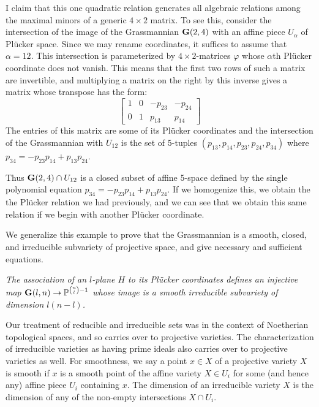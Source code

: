 \documentclass[12pt]{amsart}
\newcommand{\G}{{\bf G}}
\begin{document}
I claim that this one quadratic relation generates all algebraic relations
among the maximal minors of a generic $4\times 2$ matrix.
To see this, consider the intersection of the image of the Grassmannian
$\G(2,4)$ with an affine piece $U_\alpha$ of Pl\"ucker space.
Since we may rename coordinates, it suffices to assume that $\alpha=12$.
This intersection is parameterized by $4\times 2$-matrices $\varphi$ whose
$\alpha$th Pl\"ucker coordinate does not vanish.
This means that the first two rows of such a matrix are invertible, and
multiplying a matrix on the right by this inverse gives a matrix whose
transpose has the form:
$$
  \left[\begin{array}{cccc}
    1 & 0 & -p_{23} & -p_{24}\\
    0 & 1 &  p_{13} &  p_{14}
  \end{array}\right]
$$
The entries of this matrix are some of its Pl\"ucker
coordinates and the intersection of the Grassmannian with 
$U_{12}$ is the set of 5-tuples $(p_{13},p_{14},p_{23},p_{24},p_{34})$
where $p_{34}=-p_{23}p_{14}+p_{13}p_{24}$.

Thus $\G(2,4)\cap U_{12}$ is a closed subset of affine 5-space
defined by the single polynomial equation 
$p_{34}=-p_{23}p_{14}+p_{13}p_{24}$.
If we homogenize this, we obtain the the Pl\"ucker relation we had
previously, and we can see that we obtain this same relation if we begin
with another Pl\"ucker coordinate.
\medskip

We generalize this example to prove that the Grassmannian is a smooth,
closed, and irreducible subvariety of projective space, and give necessary
and sufficient equations.\medskip

{\it 
The association of an $l$-plane $H$ to its Pl\"ucker coordinates
defines an injective map $\G(l,n)\to {\mathbb P}^{\binom{n}{l}-1}$
whose image is a smooth irreducible subvariety of dimension
$l(n-l)$.}\medskip 

Our treatment of reducible and irreducible sets was in the context of
Noetherian topological spaces, and so carries over to projective varieties.
The characterization of irreducible varieties as having prime ideals also
carries over to projective varieties as well.
For smoothness, we say a point $x\in X$ of a projective variety $X$ is
smooth if $x$ is a smooth point of the affine variety $X\in U_i$ for some
(and hence any) affine piece $U_i$ containing $x$.
The dimension of an irreducible variety $X$ is the dimension of any of the
non-empty intersections $X\cap U_i$.\medskip
\end{document}
